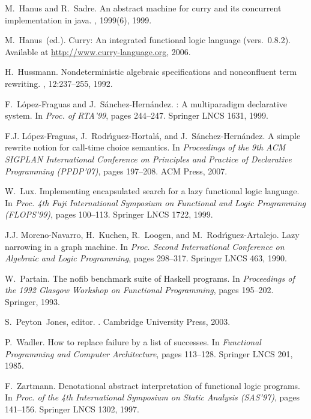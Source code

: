 \documentclass{llncs}
\begin{document}
\begin{thebibliography}{10}
M.~Hanus and R.~Sadre.
\newblock An abstract machine for curry and its concurrent implementation in
  java.
, 1999(6), 1999.

M.~Hanus~(ed.).
\newblock Curry: An integrated functional logic language (vers.\ 0.8.2).
\newblock Available at \url{http://www.curry-language.org}, 2006.

H.~Hussmann.
\newblock Nondeterministic algebraic specifications and nonconfluent term
  rewriting.
, 12:237--255, 1992.

F.~L\'opez-Fraguas and J.~S\'anchez-Hern\'andez.
: A multiparadigm declarative system.
\newblock In {\em Proc. of RTA'99}, pages 244--247. Springer LNCS 1631, 1999.

F.J. L{\'o}pez-Fraguas, J.~Rodr{\'\i}guez-Hortal{\'a}, and
  J.~S{\'a}nchez-Hern{\'a}ndez.
\newblock A simple rewrite notion for call-time choice semantics.
\newblock In {\em Proceedings of the 9th ACM SIGPLAN International Conference
  on Principles and Practice of Declarative Programming (PPDP'07)}, pages
  197--208. ACM Press, 2007.

W.~Lux.
\newblock Implementing encapsulated search for a lazy functional logic
  language.
\newblock In {\em Proc. 4th Fuji International Symposium on Functional and
  Logic Programming (FLOPS'99)}, pages 100--113. Springer LNCS 1722, 1999.

J.J. M{oreno-Navarro}, H.~Kuchen, R.~Loogen, and M.~R{odr{\'\i}guez-Artalejo}.
\newblock Lazy narrowing in a graph machine.
\newblock In {\em Proc. Second International Conference on Algebraic and Logic
  Programming}, pages 298--317. Springer LNCS 463, 1990.

W.~Partain.
\newblock The nofib benchmark suite of {H}askell programs.
\newblock In {\em Proceedings of the 1992 Glasgow Workshop on Functional
  Programming}, pages 195--202. Springer, 1993.

S.~Peyton~Jones, editor.
.
\newblock Cambridge University Press, 2003.

P.~Wadler.
\newblock How to replace failure by a list of successes.
\newblock In {\em Functional Programming and Computer Architecture}, pages
  113--128. Springer LNCS 201, 1985.

F.~Zartmann.
\newblock Denotational abstract interpretation of functional logic programs.
\newblock In {\em Proc. of the 4th International Symposium on Static Analysis
  (SAS'97)}, pages 141--156. Springer LNCS 1302, 1997.

\end{thebibliography}
\end{document}
